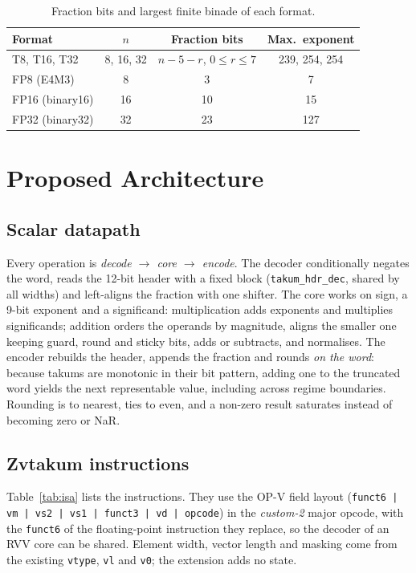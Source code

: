 \documentclass[conference]{IEEEtran}
\newcommand{\code}[1]{\texttt{#1}}
\begin{document}
\begin{table}[t]
\caption{Fraction bits and largest finite binade of each format.}
\label{tab:formats}
\centering
\setlength{\tabcolsep}{4pt}
\begin{tabular}{@{}lccc@{}}
\toprule
Format & $n$ & Fraction bits & Max.\ exponent\\
\midrule
T8, T16, T32 & 8, 16, 32 & $n-5-r$,\; $0\le r\le 7$ & 239, 254, 254\\
FP8 (E4M3) & 8 & 3 & 7\\
FP16 (binary16) & 16 & 10 & 15\\
FP32 (binary32) & 32 & 23 & 127\\
\bottomrule
\end{tabular}
\end{table}

\section{Proposed Architecture}

\subsection{Scalar datapath}

Every operation is \emph{decode $\rightarrow$ core $\rightarrow$ encode}. The decoder conditionally
negates the word, reads the 12-bit header with a fixed block (\code{takum\_hdr\_dec}, shared by all
widths) and left-aligns the fraction with one shifter. The core works on sign, a 9-bit exponent and a
significand: multiplication adds exponents and multiplies significands; addition orders the operands by
magnitude, aligns the smaller one keeping guard, round and sticky bits, adds or subtracts, and
normalises. The encoder rebuilds the header, appends the fraction and rounds \emph{on the word}: because
takums are monotonic in their bit pattern, adding one to the truncated word yields the next
representable value, including across regime boundaries. Rounding is to nearest, ties to even, and a
non-zero result saturates instead of becoming zero or NaR.

\subsection{Zvtakum instructions}

Table~\ref{tab:isa} lists the instructions. They use the OP-V field layout
(\code{funct6 | vm | vs2 | vs1 | funct3 | vd | opcode}) in the \emph{custom-2} major opcode, with the
\code{funct6} of the floating-point instruction they replace, so the decoder of an RVV core can be
shared. Element width, vector length and masking come from the existing \code{vtype}, \code{vl} and
\code{v0}; the extension adds no state.
\end{document}
